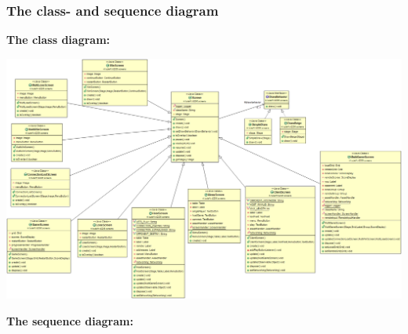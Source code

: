 \documentclass[a4paper,11pt,report]{scrartcl}
\begin{document}
\newpage\subsubsection{The class- and sequence diagram}
\textbf{The class diagram:}\\
\centerline{\includegraphics[scale=0.5]{sources/StrategyUML}}

\textbf{The sequence diagram:}\\
\end{document}
